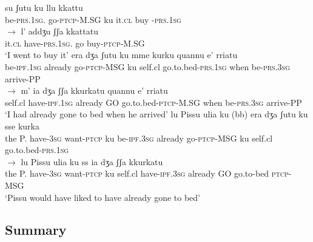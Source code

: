 \documentclass[output=paper]{langscibook}
\begin{document}
\ea\label{ac47}
    \ea \label{ac47a}
        \ea \label{ac47ai}\gll su        ʃutu        ku  llu   kkattu\\
       be-\textsc{prs}.\textsc{1sg}.    go-\textsc{ptcp}-M.SG  ku   it.\textsc{cl} buy -\textsc{prs}.\textsc{1sg}\\ 
        \ex \label{ac47aii}$\rightarrow$ \gll l’   addʒu       ʃʃa   kkattatu\\
       it.\textsc{cl} have-\textsc{prs}.\textsc{1sg}.    go  buy-\textsc{ptcp}-M.SG\\
      \glt ‘I went to buy it’
        \z
    \ex\label{ac47b}
        \ea \label{ac47bi}\gll era      dʒa    ʃutu      ku mme   kurku     quannu  e’       rriatu \\
       be-\textsc{ipf}.\textsc{1sg} already go-\textsc{ptcp}-MSG ku self.cl go.to.bed-\textsc{prs}.\textsc{1sg}
       when    be-\textsc{prs}.\textsc{3sg}  arrive-PP\\
        \ex    \label{ac47bii}$\rightarrow$  \gll m’   ia        dʒa   ʃʃa  kkurkatu        quannu  e’        rriatu\\
       self.cl  have-\textsc{ipf}.\textsc{1sg} already GO  go.to.bed-\textsc{ptcp}-M.SG  
       when    be-\textsc{prs}.\textsc{3sg}  arrive-PP\\
       \glt ‘I had already gone to bed when he arrived’
        \z
    \ex\label{ac47c}
        \ea \label{ac47ci}\gll lu Pissu ulia   ku    (bb) era    dʒa   ʃutu         ku sse    kurka\\
       the P.  have-\textsc{3sg} want-\textsc{ptcp} ku be-\textsc{ipf}.\textsc{3sg} already go-\textsc{ptcp}-MSG    ku self.cl   go.to.bed-\textsc{prs}.\textsc{1sg}\\
        \ex  \label{ac47cii}  $\rightarrow$ \gll lu Pissu ulia   ku       ss   ia      dʒa         ʃʃa  kkurkatu\\
      the P.  have-\textsc{3sg} want-\textsc{ptcp} ku self.cl  have-\textsc{ipf}.\textsc{3sg} already 
       GO go.to-bed \textsc{ptcp}-MSG\\
      \glt ‘Pissu would have liked to have already gone to bed’
        \z
    \z
\z

\subsection{Summary}
\end{document}
